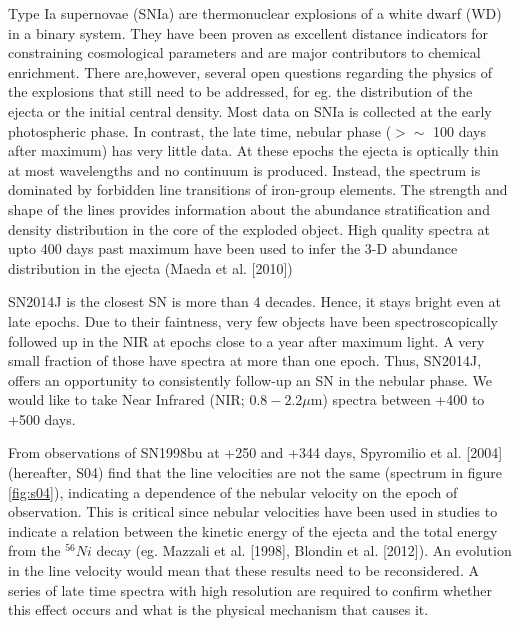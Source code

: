 \documentclass[11pt]{article}
\begin{document}
\sciencejustification    %
Type Ia supernovae (SNIa) are thermonuclear explosions of a white dwarf (WD) in a binary system. They have been proven as excellent distance indicators for constraining cosmological parameters and are major contributors to chemical enrichment. There are,however, several open questions regarding the physics of the explosions that still need to be addressed, for eg. the distribution of the ejecta or the initial central density. 
Most data on SNIa is collected at the early photospheric phase. In contrast, the late time, nebular phase ($> \sim$ 100 days after maximum) has very little data. At these epochs the ejecta is optically thin at most wavelengths and no continuum is produced. Instead, the spectrum is dominated by forbidden line transitions of iron-group elements. The strength and shape of the lines provides information about the abundance stratification and density distribution in the core of the exploded object. High quality spectra at upto 400 days past maximum have been used to infer the 3-D abundance distribution in the ejecta (Maeda et al. [2010])

SN2014J is the closest SN is more than 4 decades. Hence, it stays bright even at late epochs. Due to their faintness, very few objects have been spectroscopically followed up in the NIR at epochs close to a year after maximum light. A very small fraction of those have spectra at more than one epoch. Thus, SN2014J, offers an opportunity to consistently follow-up an SN in the nebular phase. We would like to take Near Infrared (NIR; $0.8 - 2.2 \mu$m) spectra between +400 to +500 days. 

From observations of  SN1998bu at +250 and +344 days, Spyromilio et al. [2004] (hereafter, S04) find that the line velocities are not the same (spectrum in figure \ref{fig:s04}), indicating a dependence of the nebular velocity on the epoch of observation. This is critical since nebular velocities have been used in studies to indicate a relation between the kinetic energy of the ejecta and the total energy from the $^{56} Ni$ decay (eg. Mazzali et al. [1998], Blondin et al. [2012]). An evolution in the line velocity would mean that these results need to be reconsidered. A series of late time spectra with high resolution are required to confirm whether this effect occurs and what is the physical mechanism that causes it. 
\end{document}
